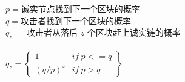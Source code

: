\documentclass[border=10pt]{standalone}
\begin{document}
$p = $诚实节点找到下一个区块的概率 \\
$q = $攻击者找到下一个区块的概率 \\
$q_z =$ 攻击者从落后 $z$ 个区块赶上诚实链的概率 \\
\\
$q_z =
 \begin{Bmatrix}
  1         & if \ p <= q \\
  (q / p)^z & if \ p > q  
 \end{Bmatrix}$
\end{document}
